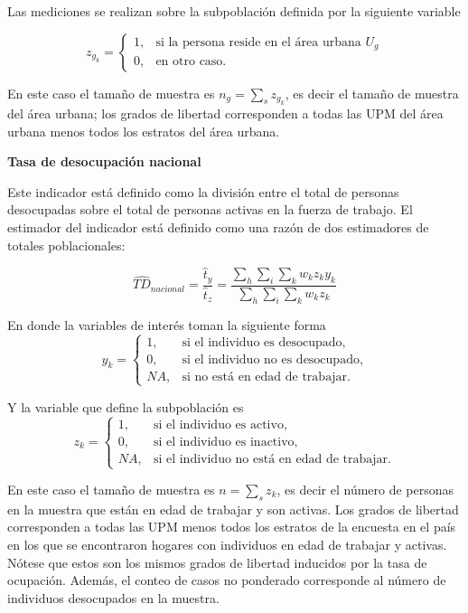 \documentclass[
  12pt,
]{book}
\begin{document}
Las mediciones se realizan sobre la subpoblación definida por la siguiente variable

\[
z_{g_k}=
\begin{cases}
1, &\text{si la persona reside en el área urbana $U_g$}\\
0, &\text{en otro caso.}
\end{cases}
\]

En este caso el tamaño de muestra es \(n_g = \sum_s z_{g_k}\), es decir el tamaño de muestra del área urbana; los grados de libertad corresponden a todas las UPM del área urbana menos todos los estratos del área urbana.

\textbf{Tasa de desocupación nacional}

Este indicador está definido como la división entre el total de personas desocupadas sobre el total de personas activas en la fuerza de trabajo. El estimador del indicador está definido como una razón de dos estimadores de totales poblacionales:

\[
\widehat{TD}_{nacional} =  \frac{\hat t_y}{\hat t_z} =\frac{\sum_h\sum_i\sum_k w_kz_{k}y_{k}}{\sum_h\sum_i\sum_k w_kz_{k}}
\]

En donde la variables de interés toman la siguiente forma
\[
y_{k}=
\begin{cases}
1, &\text{si el individuo es desocupado,}\\
0, &\text{si el individuo no es desocupado,}\\
NA, &\text{si no está en edad de trabajar.}
\end{cases}
\]

Y la variable que define la subpoblación es
\[
z_{k}=
\begin{cases}
1, &\text{si el individuo es activo,}\\
0, &\text{si el individuo es inactivo,}\\
NA, &\text{si el individuo no está en edad de trabajar.}
\end{cases}
\]

En este caso el tamaño de muestra es \(n = \sum_s z_{k}\), es decir el número de personas en la muestra que están en edad de trabajar y son activas. Los grados de libertad corresponden a todas las UPM menos todos los estratos de la encuesta en el país en los que se encontraron hogares con individuos en edad de trabajar y activas. Nótese que estos son los mismos grados de libertad inducidos por la tasa de ocupación. Además, el conteo de casos no ponderado corresponde al número de individuos desocupados en la muestra.
\end{document}
